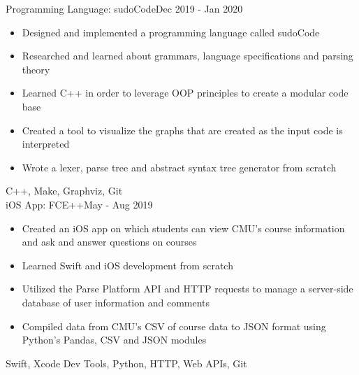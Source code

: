 %
%
%


\begin{projects}

    \project
	{Programming Language: sudoCode}{Dec 2019 - Jan 2020}
	{
	    \begin{itemize}
            \item Designed and implemented a programming language called sudoCode
            \item Researched and learned about grammars, language specifications and parsing theory
            \item Learned C++ in order to leverage OOP principles to create a modular code base
            \item Created a tool to visualize the graphs that are created as the input code is interpreted
            \item Wrote a lexer, parse tree and abstract syntax tree generator from scratch
        \end{itemize}
    }
	{C++, Make, Graphviz, Git}
    \\
	\project
	{iOS App: FCE++}{May - Aug 2019}
	{
	    \begin{itemize}
            \item Created an iOS app on which students can view CMU’s course information and ask and answer questions on courses
            \item Learned Swift and iOS development from scratch
            \item Utilized the Parse Platform API and HTTP requests to manage a server-side database of user information and comments        
            \item Compiled data from CMU’s CSV of course data to JSON format using Python’s Pandas, CSV and JSON modules
        \end{itemize}
    } 
    {Swift, Xcode Dev Tools, Python, HTTP, Web APIs, Git}

\end{projects}
